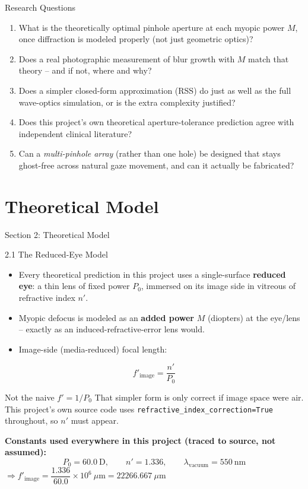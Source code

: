 \documentclass[aspectratio=169]{beamer}
\begin{document}
\begin{frame}{Research Questions}
  \begin{enumerate}
    \item What is the theoretically optimal pinhole aperture at each myopic
      power $M$, once diffraction is modeled properly (not just geometric optics)?
    \item Does a real photographic measurement of blur growth with $M$ match
      that theory -- and if not, where and why?
    \item Does a simpler closed-form approximation (RSS) do just as well as
      the full wave-optics simulation, or is the extra complexity justified?
    \item Does this project's own theoretical aperture-tolerance prediction
      agree with independent clinical literature?
    \item Can a \emph{multi-pinhole array} (rather than one hole) be designed
      that stays ghost-free across natural gaze movement, and can it actually
      be fabricated?
  \end{enumerate}
\end{frame}

\section{Theoretical Model}

\begin{frame}{Section 2: Theoretical Model}
  \tableofcontents[currentsection]
\end{frame}

\begin{frame}{2.1 The Reduced-Eye Model}
  \begin{itemize}
    \item Every theoretical prediction in this project uses a single-surface
      \textbf{reduced eye}: a thin lens of fixed power $P_0$, immersed on its
      image side in vitreous of refractive index $n'$.
    \item Myopic defocus is modeled as an \textbf{added power} $M$ (diopters)
      at the eye/lens -- exactly as an induced-refractive-error lens would.
    \item Image-side (media-reduced) focal length:
  \end{itemize}
  \[
    f'_{\text{image}} = \frac{n'}{P_0}
  \]
  \begin{alertblock}{Not the naive $f'=1/P_0$}
    That simpler form is only correct if image space were air. This project's
    own source code uses \texttt{refractive\_index\_correction=True} throughout,
    so $n'$ must appear.
  \end{alertblock}
  \textbf{Constants used everywhere in this project (traced to source, not assumed):}
  \[
    P_0 = 60.0\ \text{D}, \qquad n' = 1.336, \qquad \lambda_{\text{vacuum}} = 550\ \text{nm}
  \]
  {\scriptsize $\Rightarrow f'_{\text{image}} = \dfrac{1.336}{60.0}\times10^6\ \mu\text{m} = 22266.667\ \mu\text{m}$}
\end{frame}
\end{document}
